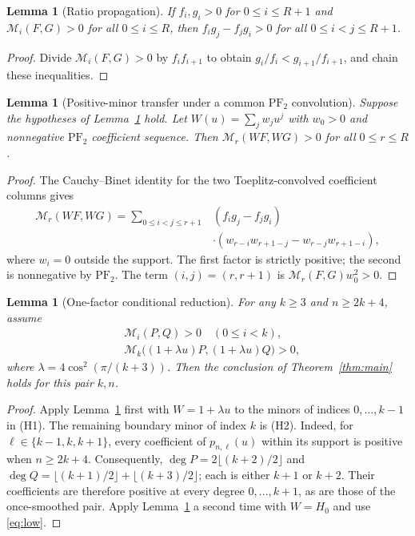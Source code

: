 \documentclass[11pt,a4paper]{article}
\newtheorem{lemma}[theorem]{Lemma}
\newcommand{\M}{\mathcal M}
\begin{document}
\begin{lemma}[Ratio propagation]\label{lem:ratio}
If $f_i,g_i>0$ for $0\le i\le R+1$ and
$\M_i(F,G)>0$ for all $0\le i\le R$, then
$f_i g_j-f_j g_i>0$ for all $0\le i<j\le R+1$.
\end{lemma}
\begin{proof}
Divide $\M_i(F,G)>0$ by $f_if_{i+1}$ to obtain
$g_i/f_i<g_{i+1}/f_{i+1}$, and chain these inequalities.
\end{proof}

\begin{lemma}[Positive-minor transfer under a common $\mathrm{PF}_2$ convolution]
\label{lem:transfer}
Suppose the hypotheses of Lemma~\ref{lem:ratio} hold. Let
$W(u)=\sum_jw_ju^j$ with $w_0>0$ and nonnegative $\mathrm{PF}_2$
coefficient sequence. Then
$\M_r(WF,WG)>0$ for all $0\le r\le R$.
\end{lemma}
\begin{proof}
The Cauchy--Binet identity for the two Toeplitz-convolved
coefficient columns gives
\begin{align*}
 \M_r(WF,WG)=\sum_{0\le i<j\le r+1}
 &(f_ig_j-f_jg_i)\\[-1mm]
 &\cdot\left(w_{r-i}w_{r+1-j}-w_{r-j}w_{r+1-i}\right),
\end{align*}
where $w_i=0$ outside the support. The first factor is strictly positive;
the second is nonnegative by $\mathrm{PF}_2$. The term
$(i,j)=(r,r+1)$ is $\M_r(F,G)w_0^2>0$.
\end{proof}

\begin{lemma}[One-factor conditional reduction]\label{lem:onefactor}
For any $k\ge3$ and $n\ge2k+4$, assume
\begin{align}
&\M_i(P,Q)>0\quad(0\le i<k), \tag{H1}\label{eq:H1}\\
&\M_k\big((1+\lambda u)P,(1+\lambda u)Q\big)>0,\tag{H2}\label{eq:H2}
\end{align}
where $\lambda=4\cos^2(\pi/(k+3))$. Then the conclusion of
Theorem~\ref{thm:main} holds for this pair $k,n$.
\end{lemma}
\begin{proof}
Apply Lemma~\ref{lem:transfer} first with $W=1+\lambda u$
to the minors of indices $0,\ldots,k-1$ in (H1). The remaining
boundary minor of index $k$ is (H2). Indeed, for $\ell\in\{k-1,k,k+1\}$, every coefficient of
$p_{n,\ell}(u)$ within its support is positive when $n\ge2k+4$.
Consequently,
$\deg P=2\lfloor(k+2)/2\rfloor$ and
$\deg Q=\lfloor(k+1)/2\rfloor+\lfloor(k+3)/2\rfloor$;
each is either $k+1$ or $k+2$. Their coefficients are therefore
positive at every degree $0,\ldots,k+1$, as are those of the
once-smoothed pair. Apply
Lemma~\ref{lem:transfer} a second time with $W=H_0$ and use
\eqref{eq:low}.
\end{proof}
\end{document}
